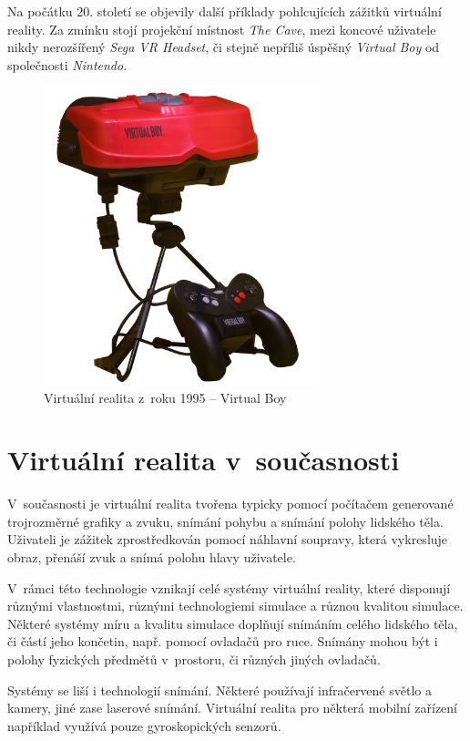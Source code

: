 Na počátku 20. století se objevily další příklady pohlcujících zážitků
virtuální reality. Za zmínku stojí projekční místnost \emph{The Cave},
mezi koncové uživatele nikdy nerozšířený \emph{Sega VR Headset}, či
stejně nepříliš úspěšný \emph{Virtual Boy} od společnosti
\emph{Nintendo}.

\begin{figure}[h!]
\centering
\includegraphics[width=8cm]{src/assets/virtual-boy.jpg}
\caption{Virtuální realita z~roku 1995 -- Virtual Boy\autocite{virtualboypic}}
\end{figure}

\section{Virtuální realita
v~současnosti}\label{virtuuxe1lnuxed-realita-v-souux10dasnosti}

V~současnosti je virtuální realita tvořena typicky pomocí počítačem
generované trojrozměrné grafiky a zvuku, snímání pohybu a snímání polohy
lidského těla. Uživateli je zážitek zprostředkován pomocí náhlavní
soupravy, která vykresluje obraz, přenáší zvuk a snímá polohu hlavy
uživatele.

V~rámci této technologie vznikají celé systémy virtuální reality,
které disponují různými vlastnostmi, různými technologiemi simulace a
různou kvalitou simulace. Některé systémy míru a kvalitu simulace
doplňují snímáním celého lidského těla, či částí jeho končetin, např.
pomocí ovladačů pro ruce. Snímány mohou být i polohy fyzických předmětů v~prostoru, či
různých jiných ovladačů. 

Systémy se liší i technologií snímání.
Některé používají infračervené světlo a kamery, jiné zase laserové
snímání. Virtuální realita pro některá mobilní zařízení například
využívá pouze gyroskopických senzorů.


